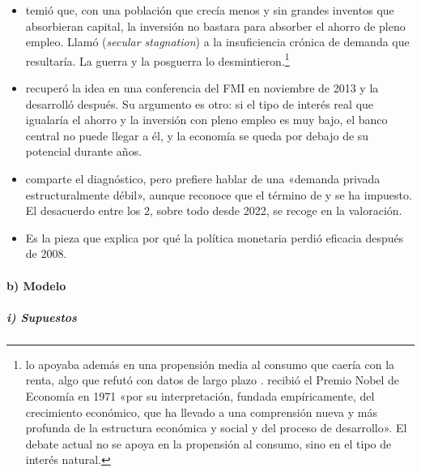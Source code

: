 \documentclass[11pt]{article}
\begin{document}
\begin{itemize}
\item \textcite{Hansen1939Economic} temió que, con una población que crecía menos y sin grandes inventos que absorbieran capital, la inversión no bastara para absorber el ahorro de pleno empleo. Llamó  (\emph{secular stagnation}) a la insuficiencia crónica de demanda que resultaría. La guerra y la posguerra lo desmintieron.\footnote{ lo apoyaba además en una propensión media al consumo que caería con la renta, algo que  refutó con datos de largo plazo .  recibió el Premio Nobel de Economía en 1971 «por su interpretación, fundada empíricamente, del crecimiento económico, que ha llevado a una comprensión nueva y más profunda de la estructura económica y social y del proceso de desarrollo»\nocite{Nobel1971Kuznets}. El debate actual no se apoya en la propensión al consumo, sino en el tipo de interés natural.}
\item {} recuperó la idea en una conferencia del FMI en noviembre de 2013\nocite{Summers2013FMI} y la desarrolló después\nocite{Summers2014Secular}. Su argumento es otro: si el tipo de interés real que igualaría el ahorro y la inversión con pleno empleo es muy bajo, el banco central no puede llegar a él, y la economía se queda por debajo de su potencial durante años.
\item {} comparte el diagnóstico, pero prefiere hablar de una «demanda privada estructuralmente débil», aunque reconoce que el término de  y  se ha impuesto\nocite{Blanchard2021LowRates,Blanchard2023Fiscal}. El desacuerdo entre los 2, sobre todo desde 2022, se recoge en la valoración.
\item Es la pieza que explica por qué la política monetaria perdió eficacia después de 2008.
\end{itemize}

\paragraph{b) Modelo}

\subparagraph{i) Supuestos}
\end{document}
